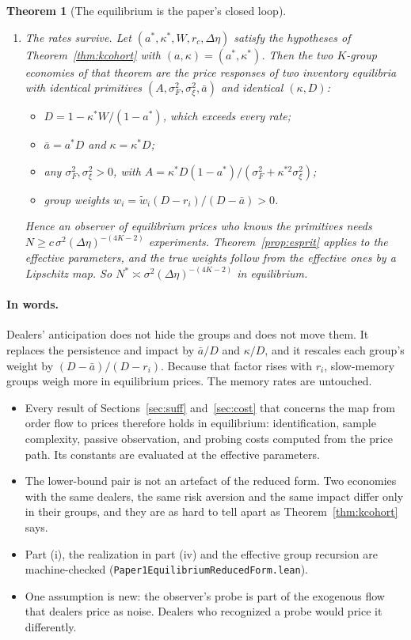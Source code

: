 \documentclass[12pt]{article}
\newtheorem{theorem}{Theorem}[section]
\theoremstyle{definition}
\theoremstyle{remark}
\begin{document}
\begin{theorem}[The equilibrium is the paper's closed loop]
\begin{enumerate}[label=(\roman*),itemsep=1pt]
\item \emph{The rates survive.} Let $(a^*,\kappa^*,W,r_c,\Delta\eta)$ satisfy the hypotheses of Theorem~\ref{thm:kcohort} with $(a,\kappa)=(a^*,\kappa^*)$. Then the two $K$-group economies of that theorem are the price responses of two inventory equilibria with identical primitives $(A,\sigma_F^2,\sigma_\xi^2,\bar a)$ and identical $(\kappa,D)$:
 \begin{itemize}[itemsep=1pt,topsep=2pt]
 \item $D=1-\kappa^*W/(1-a^*)$, which exceeds every rate;
 \item $\bar a=a^*D$ and $\kappa=\kappa^*D$;
 \item any $\sigma_F^2,\sigma_\xi^2>0$, with $A=\kappa^*D(1-a^*)/(\sigma_F^2+\kappa^{*2}\sigma_\xi^2)$;
 \item group weights $w_i=\tilde w_i(D-r_i)/(D-\bar a)>0$.
 \end{itemize}
 Hence an observer of equilibrium prices who knows the primitives needs $N\ge c\,\sigma^2(\Delta\eta)^{-(4K-2)}$ experiments. Theorem~\ref{prop:esprit} applies to the effective parameters, and the true weights follow from the effective ones by a Lipschitz map. So $N^*\asymp\sigma^2(\Delta\eta)^{-(4K-2)}$ in equilibrium.
\end{enumerate}
\end{theorem}

\paragraph{In words.} Dealers' anticipation does not hide the groups and does not move them. It replaces the persistence and impact by $\bar a/D$ and $\kappa/D$, and it rescales each group's weight by $(D-\bar a)/(D-r_i)$. Because that factor rises with $r_i$, slow-memory groups weigh more in equilibrium prices. The memory rates are untouched.
\begin{itemize}[itemsep=1pt,topsep=2pt]
\item Every result of Sections~\ref{sec:suff} and~\ref{sec:cost} that concerns the map from order flow to prices therefore holds in equilibrium: identification, sample complexity, passive observation, and probing costs computed from the price path. Its constants are evaluated at the effective parameters.
\item The lower-bound pair is not an artefact of the reduced form. Two economies with the same dealers, the same risk aversion and the same impact differ only in their groups, and they are as hard to tell apart as Theorem~\ref{thm:kcohort} says.
\item Part (i), the realization in part (iv) and the effective group recursion are machine-checked (\nolinkurl{Paper1EquilibriumReducedForm.lean}).
\item One assumption is new: the observer's probe is part of the exogenous flow that dealers price as noise. Dealers who recognized a probe would price it differently.
\end{itemize}
\end{document}
